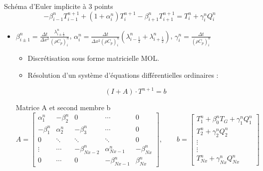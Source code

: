 \documentclass{beamer}
\begin{document}
\begin{frame}{Schéma d'Euler implicite à 3 points}
    \begin{equation}
        - \beta_{i-1}^{n} T_{i-1}^{n+1} + (1 + \alpha_i^n) T_i^{n+1} - \beta_{i+1}^{n} T_{i+1}^{n+1} = T_i^n + \gamma_i^n Q_i^n
    \end{equation}
    \begin{itemize}
        \item \footnotesize $\beta_{i \pm 1}^{n} = \frac{\Delta t}{\Delta x^2} \frac{\lambda_{i \pm \frac{1}{2}}^n}{(\rho C_p)_i^n}$, \quad $\alpha_i^n = \frac{\Delta t}{\Delta x^2 (\rho C_p)_i^n} \left( \lambda_{i - \frac{1}{2}}^n + \lambda_{i + \frac{1}{2}}^n \right)$, \quad $\gamma_i^n = \frac{\Delta t}{(\rho C_p)_i^n}$

        \begin{itemize}
        \item Discrétisation sous forme matricielle MOL.
        \item Résolution d'un système d'équations différentielles ordinaires :
        \end{itemize}
        \begin{equation}
            (I + A) \cdot T^{n+1} = b
        \end{equation}

        \begin{block}{Matrice A et second membre b}
            \footnotesize{ 
            \[
            A =
            \begin{bmatrix}
            \alpha_1^n & -\beta_2^n & 0 & \cdots & 0 \\
            -\beta_1^n & \alpha_2^n & -\beta_3^n & \cdots & 0 \\
            0 & \ddots & \ddots & \ddots & 0 \\
            \vdots & \cdots & -\beta_{Nx-2}^n & \alpha_{Nx-1}^n & -\beta_{Nx}^n \\
            0 & \cdots & 0 & -\beta_{Nx-1}^n & \beta_{Nx}^n
            \end{bmatrix}, \qquad
            b =
            \begin{bmatrix}
            T_1^n + \beta_{0}^n T_G + \gamma_1^n Q_1^n \\
            T_2^n + \gamma_2^n Q_2^n  \\
            \vdots \\
            \vdots \\
            T_{Nx}^n + \gamma_{Nx}^n Q_{Nx}^n
            \end{bmatrix}
            \]}
        \end{block}
    \end{itemize}
\end{frame}
\end{document}
